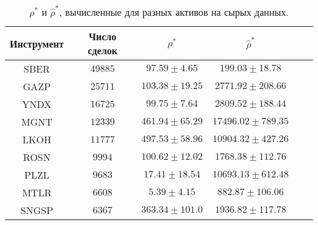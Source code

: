 \begin{table}[h!]
    \begin{center}
        \begin{tabular}{|c|c|c|c|c|c|}
            \hline
            Инструмент        & Число сделок & $\rho^*$ & $\hat \rho^*$ \\ \hline
            SBER & $49885$ & $97.59 \pm 4.65$ & $199.03 \pm 18.78$ \\ \hline 
            GAZP & $25711$ & $103.38 \pm 19.25$ & $2771.92 \pm 208.66$ \\ \hline 
            YNDX & $16725$ & $99.75 \pm 7.64$ & $2809.52 \pm 188.44$ \\ \hline 
            MGNT & $12339$ & $461.94 \pm 65.29$ & $17496.02 \pm 789.35$ \\ \hline 
            LKOH & $11777$ & $497.53 \pm 58.96$ & $10904.32 \pm 427.26$ \\ \hline 
            ROSN & $9994$ & $100.62 \pm 12.02$ & $1768.38 \pm 112.76$ \\ \hline 
            PLZL & $9683$ & $17.41 \pm 18.54$ & $10693.13 \pm 612.48$ \\ \hline 
            MTLR & $6608$ & $5.39 \pm 4.15$ & $882.87 \pm 106.06$ \\ \hline 
            SNGSP & $6367$ & $363.34 \pm 101.0$ & $1936.82 \pm 117.78$ \\ \hline 

        \end{tabular}
    \end{center}
    \caption{$\rho^*$ и $\hat \rho^*$, вычисленные для разных активов на сырых данных.}
    \label{RD_SE_1}
    \end{table} 

